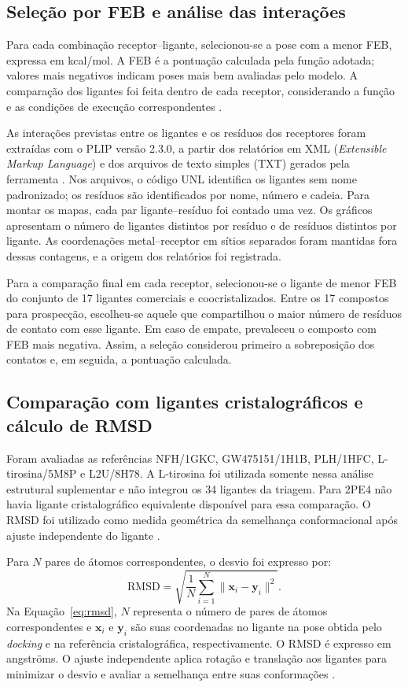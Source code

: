 \subsection{Seleção por FEB e análise das interações}
Para cada combinação receptor--ligante, selecionou-se a pose com a menor FEB, expressa em kcal/mol. A FEB é a pontuação calculada pela função adotada; valores mais negativos indicam poses mais bem avaliadas pelo modelo. A comparação dos ligantes foi feita dentro de cada receptor, considerando a função e as condições de execução correspondentes \parencite{trott2010,eberhardt2021vina,warren2006}.

As interações previstas entre os ligantes e os resíduos dos receptores foram extraídas com o PLIP versão 2.3.0, a partir dos relatórios em XML (\textit{Extensible Markup Language}) e dos arquivos de texto simples (TXT) gerados pela ferramenta \parencite{salentin2015plip}. Nos arquivos, o código UNL identifica os ligantes sem nome padronizado; os resíduos são identificados por nome, número e cadeia. Para montar os mapas, cada par ligante--resíduo foi contado uma vez. Os gráficos apresentam o número de ligantes distintos por resíduo e de resíduos distintos por ligante. As coordenações metal--receptor em sítios separados foram mantidas fora dessas contagens, e a origem dos relatórios foi registrada.

Para a comparação final em cada receptor, selecionou-se o ligante de menor FEB do conjunto de 17 ligantes comerciais e coocristalizados. Entre os 17 compostos para prospecção, escolheu-se aquele que compartilhou o maior número de resíduos de contato com esse ligante. Em caso de empate, prevaleceu o composto com FEB mais negativa. Assim, a seleção considerou primeiro a sobreposição dos contatos e, em seguida, a pontuação calculada.

\subsection{Comparação com ligantes cristalográficos e cálculo de RMSD}
Foram avaliadas as referências NFH/1GKC, GW475151/1H1B, PLH/1HFC, L-tirosina/5M8P e L2U/8H78. A L-tirosina foi utilizada somente nessa análise estrutural suplementar e não integrou os 34 ligantes da triagem. Para 2PE4 não havia ligante cristalográfico equivalente disponível para essa comparação. O RMSD foi utilizado como medida geométrica da semelhança conformacional após ajuste independente do ligante \parencite{cole2005}.

Para $N$ pares de átomos correspondentes, o desvio foi expresso por:
\begin{equation}
\label{eq:rmsd}
\mathrm{RMSD}=\sqrt{\frac{1}{N}\sum_{i=1}^{N}\|\mathbf{x}_{i}-\mathbf{y}_{i}\|^2}.
\end{equation}
Na Equação~\ref{eq:rmsd}, $N$ representa o número de pares de átomos correspondentes e $\mathbf{x}_i$ e $\mathbf{y}_i$ são suas coordenadas no ligante na pose obtida pelo \textit{docking} e na referência cristalográfica, respectivamente. O RMSD é expresso em angströms. O ajuste independente aplica rotação e translação aos ligantes para minimizar o desvio e avaliar a semelhança entre suas conformações \parencite{cole2005}.


